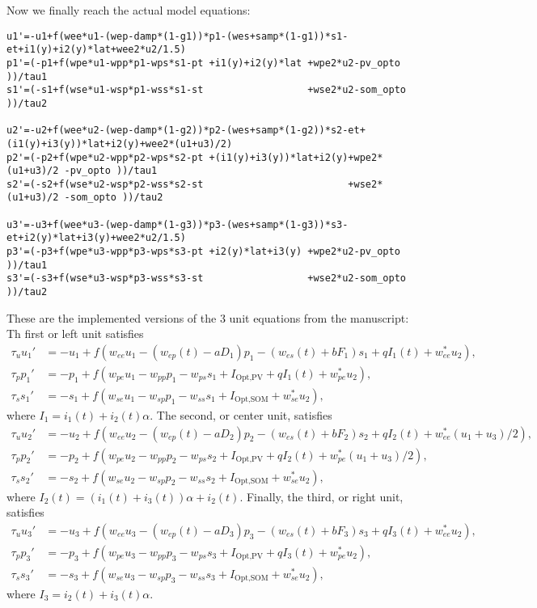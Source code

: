\documentclass[a4paper,10pt]{article}
\begin{document}
Now we finally reach the actual model equations:
\begin{verbatim}
u1'=-u1+f(wee*u1-(wep-damp*(1-g1))*p1-(wes+samp*(1-g1))*s1-et+i1(y)+i2(y)*lat+wee2*u2/1.5)
p1'=(-p1+f(wpe*u1-wpp*p1-wps*s1-pt +i1(y)+i2(y)*lat +wpe2*u2-pv_opto ))/tau1
s1'=(-s1+f(wse*u1-wsp*p1-wss*s1-st                  +wse2*u2-som_opto ))/tau2

u2'=-u2+f(wee*u2-(wep-damp*(1-g2))*p2-(wes+samp*(1-g2))*s2-et+(i1(y)+i3(y))*lat+i2(y)+wee2*(u1+u3)/2)
p2'=(-p2+f(wpe*u2-wpp*p2-wps*s2-pt +(i1(y)+i3(y))*lat+i2(y)+wpe2*(u1+u3)/2 -pv_opto ))/tau1
s2'=(-s2+f(wse*u2-wsp*p2-wss*s2-st                         +wse2*(u1+u3)/2 -som_opto ))/tau2

u3'=-u3+f(wee*u3-(wep-damp*(1-g3))*p3-(wes+samp*(1-g3))*s3-et+i2(y)*lat+i3(y)+wee2*u2/1.5)
p3'=(-p3+f(wpe*u3-wpp*p3-wps*s3-pt +i2(y)*lat+i3(y) +wpe2*u2-pv_opto ))/tau1
s3'=(-s3+f(wse*u3-wsp*p3-wss*s3-st                  +wse2*u2-som_opto ))/tau2
\end{verbatim}
These are the implemented versions of the 3 unit equations from the manuscript:
Th first or left unit satisfies
\begin{align*}
 \tau_u u_1' &= -u_1 + f( w_{ee} u_1 - (w_{ep}(t)-aD_1)p_1 - (w_{es}(t)+b F_1)s_1 + qI_1(t) + w_{ee}^* u_2),\\
 \tau_p p_1' &= -p_1 + f( w_{pe} u_1 - w_{pp}p_1 - w_{ps}s_1 + I_\text{Opt,PV} + qI_1(t) + w_{pe}^* u_2),\\
 \tau_s s_1' &= -s_1 + f( w_{se} u_1 - w_{sp}p_1 - w_{ss}s_1 + I_\text{Opt,SOM} + w_{se}^* u_2),
\end{align*}
where $I_1 = i_1(t) +i_2(t)\alpha$. The second, or center unit, satisfies
\begin{align*}
 \tau_u u_2' &= -u_2 + f( w_{ee} u_2 - (w_{ep}(t)-aD_2)p_2 - (w_{es}(t)+b F_2)s_2 + qI_2(t) + w_{ee}^* (u_1+u_3)/2),\\
 \tau_p p_2' &= -p_2 + f( w_{pe} u_2 - w_{pp}p_2 - w_{ps}s_2 + I_\text{Opt,PV} + qI_2(t) + w_{pe}^* (u_1+u_3)/2),\\
 \tau_s s_2' &= -s_2 + f( w_{se} u_2 - w_{sp}p_2 - w_{ss}s_2 + I_\text{Opt,SOM} + w_{se}^* u_2),
\end{align*}
where $I_2(t) = (i_1(t)+i_3(t))\alpha +i_2(t)$. Finally, the third, or right unit, satisfies
\begin{align*}
 \tau_u u_3' &= -u_3 + f( w_{ee} u_3 - (w_{ep}(t)-aD_3)p_3 - (w_{es}(t)+b F_3)s_3 + qI_3(t) + w_{ee}^* u_2),\\
 \tau_p p_3' &= -p_3 + f( w_{pe} u_3 - w_{pp}p_3 - w_{ps}s_3 + I_\text{Opt,PV} + qI_3(t) + w_{pe}^* u_2),\\
 \tau_s s_3' &= -s_3 + f( w_{se} u_3 - w_{sp}p_3 - w_{ss}s_3 + I_\text{Opt,SOM} + w_{se}^* u_2), 
\end{align*}
where $I_3 = i_2(t) +i_3(t)\alpha$.
\end{document}
